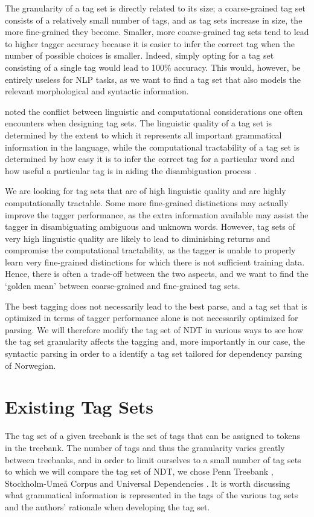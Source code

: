 \documentclass[a4paper,12pt,english]{book}
\begin{document}
The granularity of a tag set is directly related to its size; a coarse-grained
tag set consists of a relatively small number of tags, and as tag sets increase
in size, the more fine-grained they become. Smaller, more coarse-grained tag
sets tend to lead to higher tagger accuracy because it is easier to infer the
correct tag when the number of possible choices is smaller. Indeed, simply
opting for a tag set consisting of a single tag would lead to 100\% accuracy.
This would, however, be entirely useless for NLP tasks, as we want to find a
tag set that also models the relevant morphological and syntactic information.

 noted the conflict between linguistic and computational
considerations one often encounters when designing tag sets. The linguistic
quality of a tag set is determined by the extent to which it represents all
important grammatical information in the language, while the computational
tractability of a tag set is determined by how easy it is to infer the correct
tag for a particular word and how useful a particular tag is in aiding the
disambiguation process \cite{Lee:97}.

We are looking for tag sets that are of high linguistic quality and are highly
computationally tractable. Some more fine-grained distinctions may actually
improve the tagger performance, as the extra information available may assist
the tagger in disambiguating ambiguous and unknown words. However, tag sets of
very high linguistic quality are likely to lead to diminishing returns and
compromise the computational tractability, as the tagger is unable to properly
learn very fine-grained distinctions for which there is not sufficient training
data. Hence, there is often a trade-off between the two aspects, and we want
to find the `golden mean' between coarse-grained and fine-grained tag sets.

The best tagging does not necessarily lead to the best parse, and a tag set
that is optimized in terms of tagger performance alone is not necessarily
optimized for parsing. We will therefore modify the tag set of NDT in various
ways to see how the tag set granularity affects the tagging and, more
importantly in our case, the syntactic parsing in order to a identify a tag set
tailored for dependency parsing of Norwegian.

\section{Existing Tag Sets}
\label{sec:extagsets}
The tag set of a given treebank is the set of tags that can be assigned to
tokens in the treebank. The number of tags and thus the granularity varies
greatly between treebanks, and in order to limit ourselves to a small number of
tag sets to which we will compare the tag set of NDT, we chose Penn Treebank
\cite{Mar:San:Mar:93}, Stockholm-Umeå Corpus \cite{Gus:Har:06} and Universal
Dependencies \cite{Niv:15}.  It is worth discussing what grammatical
information is represented in the tags of the various tag sets and the authors'
rationale when developing the tag set.
\end{document}
